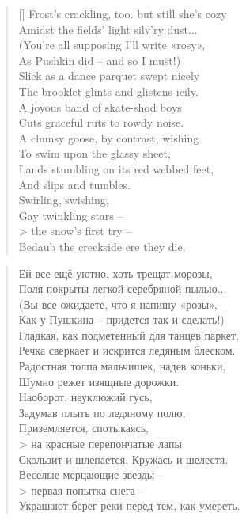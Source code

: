 \documentclass[../main.tex]{subfiles}
\begin{document}
\setlength\columnsep{1em}
\begin{paracol}{2}

\begingroup
\setlength{\vleftmargin}{0em}
\begin{verse}[\linewidth]
    Frost's crackling, too. but still she's cozy \\
    Amidst the fields' light silv'ry dust... \\
    (You're all supposing I'll write «rosy», \\
    As Pushkin did \--- and so I must!) \\
    Slick as a dance parquet swept nicely \\
    The brooklet glints and glistens icily. \\
    A joyous band of skate-shod boys \\
    Cuts graceful ruts to rowdy noise. \\
    A clumsy goose, by contrast, wishing \\
    To swim upon the glassy sheet, \\
    Lands stumbling on its red webbed feet, \\
    And slips and tumbles. \\
    Swirling, swishing, \\
    Gay twinkling stars \--- \\>
        the snow's first try \--- \\
    Bedaub the creekside ere they die.
\end{verse}
\endgroup

\switchcolumn

\begingroup
\setlength{\vleftmargin}{0em}
\begin{verse}
    Ей все ещё уютно, хоть трещат морозы, \\
    Поля покрыты легкой серебряной пылью... \\
    (Вы все ожидаете, что я напишу «розы», \\
    Как у Пушкина \--- придется так и сделать!) \\
    Гладкая, как подметенный для танцев паркет, \\
    Речка сверкает и искрится ледяным блеском. \\
    Радостная толпа мальчишек, надев коньки, \\
    Шумно режет изящные дорожки. \\
    Наоборот, неуклюжий гусь, \\
    Задумав плыть по ледяному полю, \\
    Приземляется, спотыкаясь, \\>
        на красные перепончатые лапы \\
    Скользит и шлепается.
    Кружась и шелестя. \\
    Веселые мерцающие звезды \--- \\>
        первая попытка снега \--- \\
    Украшают берег реки перед тем, как умереть.
\end{verse}
\endgroup

\end{paracol}
\end{document}
